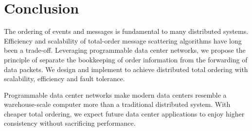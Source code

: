 \section{Conclusion}
\label{sec:conclusion}

The ordering of events and messages is fundamental to many distributed systems.
Efficiency and scalability of total-order message scattering algorithms have long been a trade-off.
Leveraging programmable data center networks, we propose the principle of separate the bookkeeping of order information from the forwarding of data packets.
We design and implement \sys to achieve distributed total ordering with scalability, efficiency and fault tolerance.

Programmable data center networks make modern data centers resemble a warehouse-scale computer more than a traditional distributed system.
With cheaper total ordering, we expect future data center applications to enjoy higher consistency without sacrificing performance.